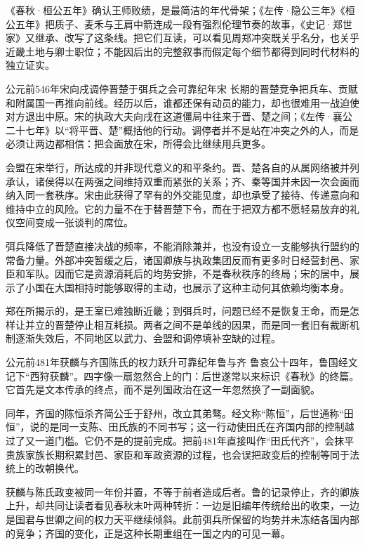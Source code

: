 \begin{sourcenote}[繻葛的箭伤与周郑的土地]
《春秋·桓公五年》确认王师败绩，是最简洁的年代骨架；《左传·隐公三年》《桓公五年》把质子、麦禾与王肩中箭连成一段有强烈伦理节奏的故事，《史记·郑世家》又继承、改写了这条线。把它们互读，可以看见周郑冲突既关乎名分，也关乎近畿土地与卿士职位；不能因后出的完整叙事而假定每个细节都得到同时代材料的独立证实。
\end{sourcenote}

\begin{event}{公元前546年}{宋向戌调停晋楚于弭兵之会}{可靠纪年}{宋}
长期的晋楚竞争把兵车、贡赋和附属国一再推向前线。经历以后，谁都还保有动员的能力，却也很难用一战迫使对方退出中原。宋的执政大夫向戌在这道僵局中往来于晋、楚之间；《左传·襄公二十七年》以“将平晋、楚”概括他的行动。调停者并不是站在冲突之外的人，而是必须让两边都相信：把会面放在宋，所得会比继续用兵更多。

会盟在宋举行，所达成的并非现代意义的和平条约。晋、楚各自的从属网络被并列承认，诸侯得以在两强之间维持双重而紧张的关系；齐、秦等国并未因一次会面而纳入同一套秩序。宋由此获得了罕有的外交能见度，却也承受了接待、传递意向和维持中立的风险。它的力量不在于替晋楚下令，而在于把双方都不愿轻易放弃的礼仪空间变成一张谈判的席位。

弭兵降低了晋楚直接决战的频率，不能消除兼并，也没有设立一支能够执行盟约的常备力量。外部冲突暂缓之后，诸国卿族与执政集团反而有更多时日经营封邑、家臣和军队。因而它是资源消耗后的均势安排，不是春秋秩序的终局；宋的居中，展示了小国在大国相持时能够取得的主动，也展示了这种主动何其依赖均衡本身。
\end{event}

\begin{causalchain}[从战争消耗到宋地会盟]
郑在所揭示的，是王室已难独断近畿；到弭兵时，问题已经不是恢复王命，而是怎样让并立的晋楚停止相互耗损。两者之间不是单线的因果，而是同一套旧有裁断机制逐渐失效后，不同地区以武力、会盟和调停填补空缺的过程。
\end{causalchain}

\begin{event}{公元前481年}{获麟与齐国陈氏的权力跃升}{可靠纪年}{鲁与齐}
鲁哀公十四年，鲁国经文记下“西狩获麟”。四字像一扇忽然合上的门：后世遂常以来标识《春秋》的终篇。它首先是文本传承的终点，而不是列国政治在这一年忽然换了一副面貌。

同年，齐国的陈恒杀齐简公壬于舒州，改立其弟骜。经文称“陈恒”，后世通称“田恒”，说的是同一支陈、田氏族的不同书写；这一行动使田氏在齐国内部的控制越过了又一道门槛。它仍不是的提前完成。把前481年直接叫作“田氏代齐”，会抹平贵族家族长期积累封邑、家臣和军政资源的过程，也会误把政变后的控制等同于法统上的改朝换代。

获麟与陈氏政变被同一年份并置，不等于前者造成后者。鲁的记录停止，齐的卿族上升，却共同让读者看见春秋末叶两种转折：一边是旧编年传统给出的收束，一边是国君与世卿之间的权力天平继续倾斜。此前弭兵所保留的均势并未冻结各国内部的竞争；齐国的变化，正是这种长期重组在一国之内的可见一幕。
\end{event}

